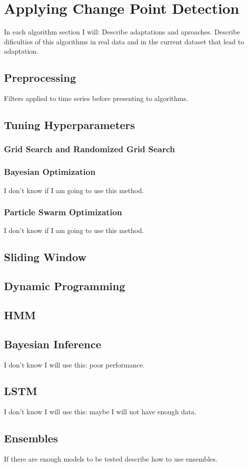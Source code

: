 \chapter{Applying Change Point Detection}
  In each algorithm section I will: Describe adaptations and aproaches. Describe dificulties of this algorithms in real data and in the current dataset that lead to adaptation.
  \section{Preprocessing}
  Filters applied to time series before presenting to algorithms.
  \section{Tuning Hyperparameters}
  	\subsection{Grid Search and Randomized Grid Search}
  	\subsection{Bayesian Optimization}
  	I don't know if I am going to use this method.
  	\subsection{Particle Swarm Optimization}
  	I don't know if I am going to use this method.
  \section{Sliding Window}
  \section{Dynamic Programming}
  \section{HMM}
  \section{Bayesian Inference}
  I don't know I will use this: poor performance.
  \section{LSTM}
  I don't know I will use this: maybe I will not have enough data. 
  \section{Ensembles}
  If there are enough models to be tested describe how to use ensembles.

